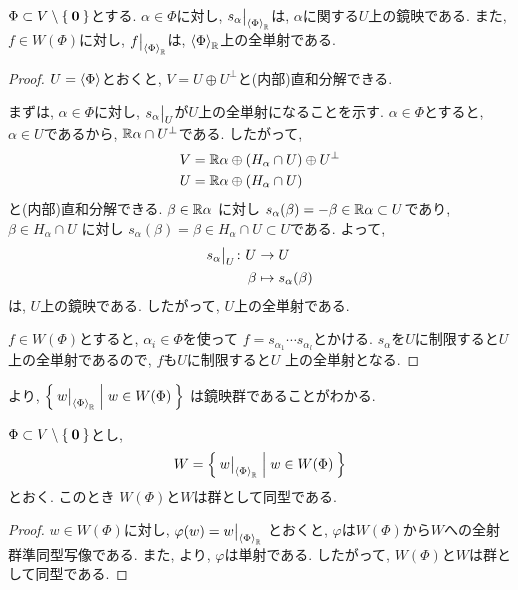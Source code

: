 \begin{lemma}
  \label{lem:esspart}
  $\Phi\subset V\setminus\Set{\boldsymbol{0}}$とする.
  $\alpha\in\Phi$に対し,
  $s_\alpha\bigr|_{\Braket{\Phi}_{\mathbb{R}}}$は,
  $\alpha$に関する$U$上の鏡映である.
  また,
  $f\in W(\Phi)$に対し,
  $f\bigr|_{\Braket{\Phi}_{\mathbb{R}}}$は,
  $\Braket{\Phi}_{\mathbb{R}}$上の全単射である.
\end{lemma}
\begin{proof}
  $U=\Braket{\Phi}$とおくと,
  $V=U\oplus U^\perp$と(内部)直和分解できる.

  まずは, $\alpha\in\Phi$に対し,
  $s_\alpha\bigr|_{U}$が$U$上の全単射になることを示す.
  $\alpha\in \Phi$とすると,
  $\alpha\in U$であるから,
  $\mathbb{R}\alpha\cap U^{\perp}$である.
  したがって,
  \begin{align*}
    V&=\mathbb{R}\alpha\oplus(H_\alpha\cap U)\oplus U^\perp\\
    U&=\mathbb{R}\alpha\oplus(H_\alpha\cap U)
  \end{align*}
  と(内部)直和分解できる.
  $\beta\in\mathbb{R}\alpha$ に対し
  $s_\alpha(\beta)=-\beta\in \mathbb{R}\alpha\subset U$であり,
  $\beta\in H_\alpha\cap U$ に対し
  $s_\alpha(\beta)=\beta\in H_\alpha\cap U\subset U$である.
  よって,
  \begin{align*}
    s_\alpha\bigr|_{U}\colon U&\to U\\
    \beta&\mapsto s_\alpha(\beta)
  \end{align*}
  は, $U$上の鏡映である.
  したがって, $U$上の全単射である.

  
  $f\in W(\Phi)$とすると,
  $\alpha_i\in \Phi$を使って
  $f=s_{\alpha_1}\cdots s_{\alpha_l}$とかける.
  $s_\alpha$を$U$に制限すると$U$上の全単射であるので,
  $f$も$U$に制限すると$U$
  上の全単射となる.
\end{proof}
より,
$\Set{w\bigr|_{\Braket{\Phi}_{\mathbb{R}}}|w\in W(\Phi)}$
は鏡映群であることがわかる.

\begin{lemma}
  $\Phi\subset V\setminus\Set{\boldsymbol{0}}$とし,
  \begin{align*}
    W=\Set{w\bigr|_{\Braket{\Phi}_{\mathbb{R}}}|w\in W(\Phi)}
  \end{align*}
  とおく.
  このとき
  $W(\Phi)$と$W$は群として同型である.
\end{lemma}
\begin{proof}
  $w\in W(\Phi)$に対し,
  $\varphi(w)=w\bigr|_{\Braket{\Phi}_{\mathbb{R}}}$
  とおくと,
  $\varphi$は$W(\Phi)$から$W$への全射群準同型写像である.
  また,
  より,
  $\varphi$は単射である.
  したがって,
  $W(\Phi)$と$W$は群として同型である.
\end{proof}

